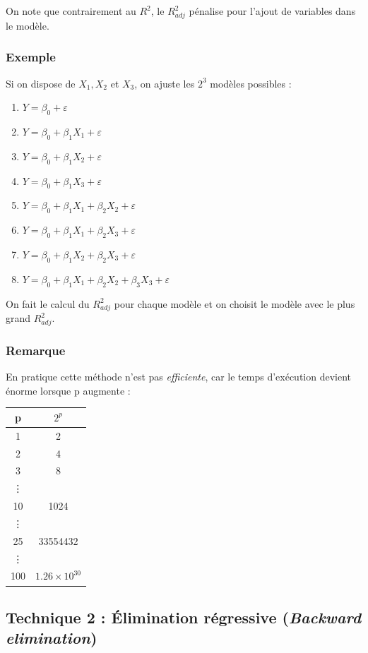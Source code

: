 \documentclass[11pt,french]{report}
\begin{document}
On note que contrairement au $R^2$, le $R^2_{adj}$ pénalise pour l'ajout de variables dans le modèle.

\bigskip
\subsubsection*{Exemple}
Si on dispose de $X_1, X_2$ et $X_3$, on ajuste les $2^3$ modèles possibles :
\begin{enumerate}
\item $Y = \beta_0 + \varepsilon$
\item $Y = \beta_0 + \beta_1X_1 + \varepsilon$
\item $Y = \beta_0 + \beta_1X_2 + \varepsilon$
\item $Y = \beta_0 + \beta_1X_3 + \varepsilon$
\item $Y = \beta_0 + \beta_1X_1 + \beta_2X_2 + \varepsilon$
\item $Y = \beta_0 + \beta_1X_1 + \beta_2X_3 + \varepsilon$
\item $Y = \beta_0 + \beta_1X_2 + \beta_2X_3 + \varepsilon$
\item $Y = \beta_0 + \beta_1X_1 + \beta_2X_2 + \beta_3X_3 + \varepsilon$
\end{enumerate}
On fait le calcul du $R^2_{adj}$ pour chaque modèle et on choisit le modèle avec le plus grand $R^2_{adj}$.

\subsubsection*{Remarque}
En pratique cette méthode n'est pas \emph{efficiente}, car le temps d'exécution devient énorme lorsque p augmente :

\begin{center}
\begin{tabular}{|c|c|}
\hline
p & $2^p$ \\
\hline
1 & 2 \\
2 & 4 \\
3 & 8 \\
\vdots & \\
10 & 1024 \\
\vdots & \\
25 & 33554432 \\
\vdots & \\
100 & $1.26\times 10^{30}$ \\
\hline
\end{tabular}
\end{center}

\subsection{Technique 2 : Élimination régressive (\emph{Backward elimination})}
\label{tech2}
\end{document}
